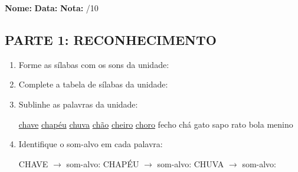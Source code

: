 \begin{exercicio}

\noindent\textbf{Nome:} \underline{\hspace{3.2cm}} \quad \textbf{Data:} \underline{\hspace{1.6cm}} \quad \textbf{Nota:} \underline{\hspace{0.9cm}}/10


\subsection*{PARTE 1: RECONHECIMENTO}

\begin{enumerate}

  \item Forme as sílabas com os sons da unidade:

\begin{center}
\end{center}

  \item Complete a tabela de sílabas da unidade:

\begin{center}
\end{center}

  \item Sublinhe as palavras da unidade:

\begin{center}
  \uline{chave} \quad \uline{chapéu} \quad \uline{chuva} \quad \uline{chão} \quad \uline{cheiro} \quad \uline{choro} \quad fecho \quad chá \quad gato \quad sapo \quad rato \quad bola \quad menino
\end{center}

  \item Identifique o som-alvo em cada palavra:
  \begin{center}
  CHAVE $\rightarrow$ som-alvo: \underline{\hspace{1cm}} \quad CHAPÉU $\rightarrow$ som-alvo: \underline{\hspace{1cm}} \quad CHUVA $\rightarrow$ som-alvo: \underline{\hspace{1cm}}
  \end{center}


\end{enumerate}
\end{exercicio}
